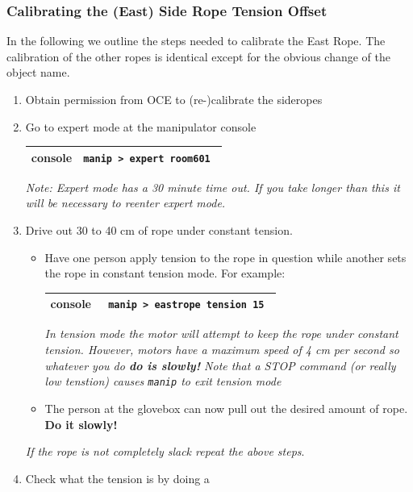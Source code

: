 \documentclass[11pt]{article}
\begin{document}
\subsubsection{Calibrating the (East) Side Rope Tension Offset}
In the following we outline the steps needed to calibrate the East Rope. The calibration of the other ropes is identical except for the obvious change of the object name. 
\begin{enumerate}
\item \CheckBox[name=cesr1]{} Obtain permission from OCE to (re-)calibrate the sideropes
\item \CheckBox[name=cesr2]{} Go to expert mode at the manipulator console
\begin{center}
\begin{tabular}{|c|c|}
\hline
console & \verb+manip > expert room601 +\\
\hline
\end{tabular}
\end{center}
{\it Note: Expert mode has a 30 minute time out. If you take longer than this it will be necessary to reenter expert mode.}
\item \CheckBox[name=cesr3]{} Drive out 30 to 40 cm of rope under constant tension.
\begin{itemize}
\item Have one person apply tension to the rope in question while another sets the rope in constant tension mode. For example:
\begin{center}
\begin{tabular}{|c|c|}
\hline
console & \verb+ manip > eastrope tension 15 +\\
\hline
\end{tabular}
\end{center}
{\it In tension mode the motor will attempt to keep the rope under constant tension. However, motors have a maximum speed of 4 cm per second so whatever you do {\bf do is slowly!} Note that a STOP command (or really low tenstion) causes \verb+manip+ to exit tension mode}
\item The person at the glovebox can now pull out the desired amount of rope. {\bf Do it slowly!}
\end{itemize}
{\it If the rope is not completely slack repeat the above steps}.
\item \CheckBox[name=cesr4]{} Check what the tension is by doing a 

\end{enumerate}
\end{document}
